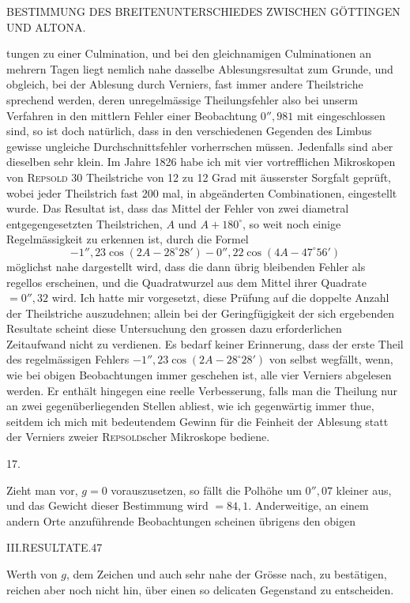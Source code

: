 \clearpage
\noindent{}\parbox[t]{\dimexpr\textwidth-10mm\relax}{\centering\scriptsize BESTIMMUNG DES BREITENUNTERSCHIEDES ZWISCHEN GÖTTINGEN UND ALTONA.}\par
\noindent tungen zu einer Culmination, und bei den gleichnamigen Culminationen an mehrern Tagen liegt nemlich nahe dasselbe Ablesungsresultat zum Grunde, und obgleich, bei der Ablesung durch Verniers, fast immer andere Theilstriche sprechend werden, deren unregelmässige Theilungsfehler also bei unserm Verfahren in den mittlern Fehler einer Beobachtung $0''{,}981$ mit eingeschlossen sind, so ist doch natürlich, dass in den verschiedenen Gegenden des Limbus gewisse ungleiche Durchschnittsfehler vorherrschen müssen. Jedenfalls sind aber dieselben sehr klein. Im Jahre 1826 habe ich mit vier vortrefflichen Mikroskopen von \textsc{Repsold} 30 Theilstriche von 12 zu 12 Grad mit äusserster Sorgfalt geprüft, wobei jeder Theilstrich fast 200 mal, in abgeänderten Combinationen, eingestellt wurde. Das Resultat ist, dass das Mittel der Fehler von zwei diametral entgegengesetzten Theilstrichen, $A$ und $A+180^\circ$, so weit noch einige Regelmässigkeit zu erkennen ist, durch die Formel
\[
-1''{,}23\cos(2A-28^\circ28')-0''{,}22\cos(4A-47^\circ56')
\]
möglichst nahe dargestellt wird, dass die dann übrig bleibenden Fehler als regellos erscheinen, und die Quadratwurzel aus dem Mittel ihrer Quadrate $=0''{,}32$ wird. Ich hatte mir vorgesetzt, diese Prüfung auf die doppelte Anzahl der Theilstriche auszudehnen; allein bei der Geringfügigkeit der sich ergebenden Resultate scheint diese Untersuchung den grossen dazu erforderlichen Zeitaufwand nicht zu verdienen. Es bedarf keiner Erinnerung, dass der erste Theil des regelmässigen Fehlers $-1''{,}23\cos(2A-28^\circ28')$ von selbst wegfällt, wenn, wie bei obigen Beobachtungen immer geschehen ist, alle vier Verniers abgelesen werden. Er enthält hingegen eine reelle Verbesserung, falls man die Theilung nur an zwei gegenüberliegenden Stellen abliest, wie ich gegenwärtig immer thue, seitdem ich mich mit bedeutendem Gewinn für die Feinheit der Ablesung statt der Verniers zweier \textsc{Repsold}scher Mikroskope bediene.
\begin{center}17.\end{center}
Zieht man vor, $g=0$ vorauszusetzen, so fällt die Polhöhe um $0''{,}07$ kleiner aus, und das Gewicht dieser Bestimmung wird $=84{,}1$. Anderweitige, an einem andern Orte anzuführende Beobachtungen scheinen übrigens den obigen

\clearpage
\noindent\mbox{}\hfill III.\quad RESULTATE.\hfill 47\par
\noindent Werth von $g$, dem Zeichen und auch sehr nahe der Grösse nach, zu bestätigen, reichen aber noch nicht hin, über einen so delicaten Gegenstand zu entscheiden.

